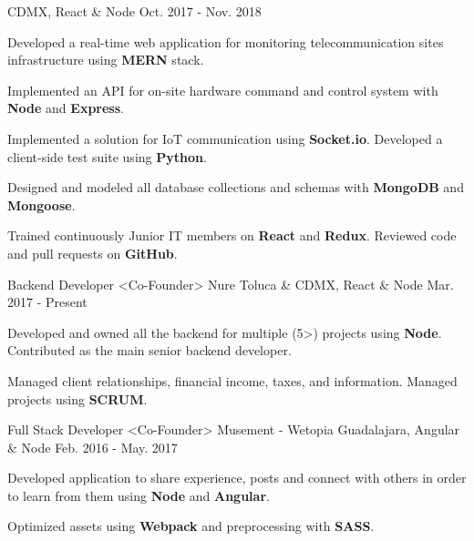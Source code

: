 \begin{cventries}
    {CDMX, React \& Node}
    {Oct. 2017 - Nov. 2018}
    {
      \begin{cvitems}
        \item {Developed a real-time web application for monitoring telecommunication sites infrastructure using \textbf{MERN} stack.}
        \item {Implemented an API for on-site hardware command and control system with \textbf{Node} and \textbf{Express}.}
        \item {Implemented a solution for IoT communication using \textbf{Socket.io}. Developed a client-side test suite using \textbf{Python}.}
        \item {Designed and modeled all database collections and schemas with \textbf{MongoDB} and \textbf{Mongoose}.}
        \item {Trained continuously Junior IT members on \textbf{React} and \textbf{Redux}. Reviewed code and pull requests on \textbf{GitHub}.}
      \end{cvitems}
    }
    \cventry
      {Backend Developer <Co-Founder>}
      {Nure}
      {Toluca \& CDMX, React \& Node}
      {Mar. 2017 - Present}
      {
        \begin{cvitems}
          \item {Developed and owned all the backend for multiple (5>) projects using \textbf{Node}. Contributed as the main senior backend developer.}
           \item {Managed client relationships, financial income, taxes, and information. Managed projects using \textbf{SCRUM}.}
        \end{cvitems}
      }
    \cventry
      {Full Stack Developer <Co-Founder>}
      {Musement - Wetopia}
      {Guadalajara, Angular \& Node}
      {Feb. 2016 - May. 2017}
      {
        \begin{cvitems}
          \item {Developed application to share experience, posts and connect with others in order to learn from them using \textbf{Node} and \textbf{Angular}.}
          \item {Optimized assets using \textbf{Webpack} and preprocessing with \textbf{SASS}.}
        \end{cvitems}
      }
  \end{cventries}
